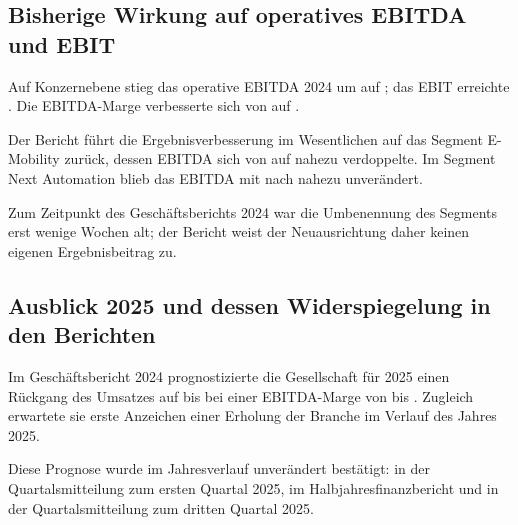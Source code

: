 \subsection{Bisherige Wirkung auf operatives EBITDA und EBIT}
\label{subsec:wirkung}

Auf Konzernebene stieg das operative EBITDA 2024 um
\Pct{\EbitdaOpDeltaZFIV} auf \MioEUR{\EbitdaOpZFIV}; das EBIT erreichte
\MioEUR{\EbitZFIV}. Die EBITDA-Marge verbesserte sich von
\Pct{\EbitdaMargeZFIII} auf \Pct{\EbitdaMargeZFIV}.

Der Bericht f\"uhrt die Ergebnisverbesserung im Wesentlichen auf das Segment
E-Mobility zur\"uck, dessen EBITDA sich von \MioEUR{\EbitdaEMobilityZFIII} auf
\MioEUR{\EbitdaEMobilityZFIV} nahezu verdoppelte. Im
Segment Next Automation blieb das EBITDA mit
\MioEUR{\EbitdaNextAutoZFIV} nach \MioEUR{\EbitdaNextAutoZFIII} nahezu
unver\"andert.

Zum Zeitpunkt des Gesch\"aftsberichts 2024 war die Umbenennung des Segments
erst wenige Wochen alt; der Bericht weist der Neuausrichtung daher keinen
eigenen Ergebnisbeitrag zu.

\subsection{Ausblick 2025 und dessen Widerspiegelung in den Berichten}
\label{subsec:ausblick}

Im Gesch\"aftsbericht 2024 prognostizierte die Gesellschaft f\"ur 2025 einen
R\"uckgang des Umsatzes auf \MioEUR{\PrognoseUmsatzZFVUnten} bis
\MioEUR{\PrognoseUmsatzZFVOben} bei einer EBITDA-Marge von
\Pct{\PrognoseMargeZFVUnten} bis \Pct{\PrognoseMargeZFVOben}. Zugleich
erwartete sie erste Anzeichen einer Erholung der Branche im Verlauf des Jahres
2025.

Diese Prognose wurde im Jahresverlauf unver\"andert best\"atigt: in der
Quartalsmitteilung zum ersten Quartal
2025, im
Halbjahresfinanzbericht und in
der Quartalsmitteilung zum dritten Quartal
2025.

